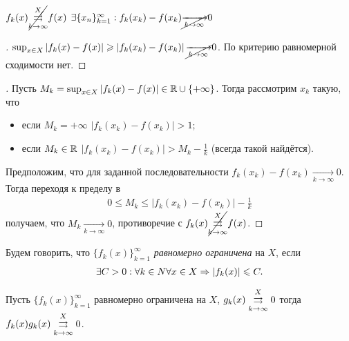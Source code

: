 \documentclass[../main.tex]{subfiles}
\begin{document}
 
 \begin{corollary}
   $ f_k(x) \cancel{\convergesuniformly{k \to \infty}{X}} f(x)$ \nas $ \exists \{x_{n}\}_{k=1}^{ \infty} : f_k(x_k ) - f(x_k ) \cancel{  \xrightarrow[k \to  \infty ]{} } 0$ 
 \end{corollary}

 \begin{proof}[\circled{\lhence}]
   $ \sup_{x \in X } \left| f_k (x) - f(x)   \right| \geq \left| f_k(x_k ) - f(x_k )  \right| \cancel{\xrightarrow[k \to  \infty ]{}} 0 $. По критерию равномерной сходимости нет. 
 \end{proof}

 \begin{proof}[\circled{\hence}]
   Пусть $ M_k = \sup_{x \in X} \left| f_k(x)  - f(x)  \right| \in \R \cup \{ + \infty \} $. Тогда рассмотрим $ x_k $ такую, что 
   \begin{itemize}
     \item если $ M_k = + \infty$ $ \left| f_k(x_k ) - f(x_k ) \right| > 1$;
     \item если $ M_k \in \R$ $ \left| f_k (x_k ) - f(x_k ) \right| > M_k - \frac{1}{k}$ (всегда такой найдётся).  
   \end{itemize}
   Предположим, что для заданной последовательности $ f_k (x_k ) - f(x_k )  \xrightarrow[k \to  \infty ]{} 0 $. Тогда переходя к пределу в 
   \begin{gather} 
      0 \leq M_k \leq \left| f_k (x_k) - f(x_k )\right| - \frac{1}{k}
   \end{gather} 
   получаем, что $ M_k  \xrightarrow[k \to  \infty ]{} 0 $, противоречие с $ f_k(x) \cancel{\convergesuniformly{k \to \infty}{X}} f(x)$. 
 \end{proof}

 
 \begin{definition}
   Будем говорить, что $ \{ f_{k}(x) \}_{k = 1}^{\infty} $ \emph{равномерно ограничена} на $ X$, если 
   \begin{gather} 
     \exists C > 0: \forall k \in N \forall x \in X \hence \left| f_k(x)  \right| \leq C .
   \end{gather}
 \end{definition}
 
 
 \begin{proposition}
   Пусть $ \{ f_{k}(x) \}_{k = 1}^{\infty} $ равномерно ограничена на $ X$, $ g_k(x) \convergesuniformly{k \to \infty}{X} 0$ тогда $ f_k(x) g_k(x)  \convergesuniformly{k \to \infty}{X} 0$.
 \end{proposition}
 
\end{document}
